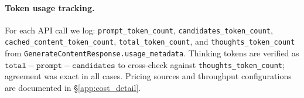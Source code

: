\paragraph{Token usage tracking.}
For each API call we log: \texttt{prompt\_token\_count}, \texttt{candidates\_token\_count}, \texttt{cached\_content\_token\_count}, \texttt{total\_token\_count}, and \texttt{thoughts\_token\_count} from \texttt{GenerateContentResponse.usage\_metadata}.
Thinking tokens are verified as $\texttt{total} - \texttt{prompt} - \texttt{candidates}$ to cross-check against \texttt{thoughts\_token\_count}; agreement was exact in all cases.
Pricing sources and throughput configurations are documented in \S\ref{app:cost_detail}.
